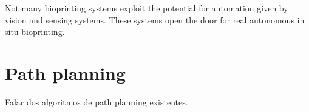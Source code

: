 Not many bioprinting systems exploit the potential for automation given by vision and sensing systems. These systems open the door for real autonomous in situ bioprinting.


\section{Path planning}
\label{sec:path_planning}

Falar dos algoritmos de path planning existentes.

